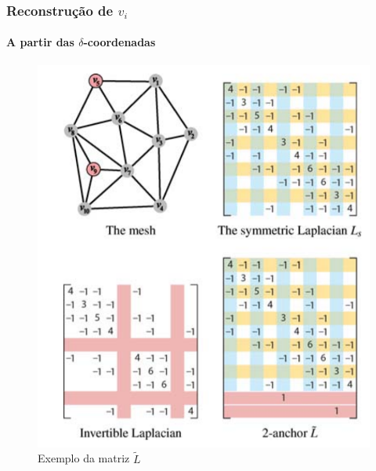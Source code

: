 \begin{frame}
\frametitle{Reconstrução de $v_i$}
\framesubtitle{A partir das $\delta$-coordenadas}

\begin{figure}
\includegraphics[width=0.5\linewidth]{img/lrestricao.png}
\caption{Exemplo da matriz $\tilde{L}$ \cite{sorkine2006}}
\end{figure}

\end{frame}